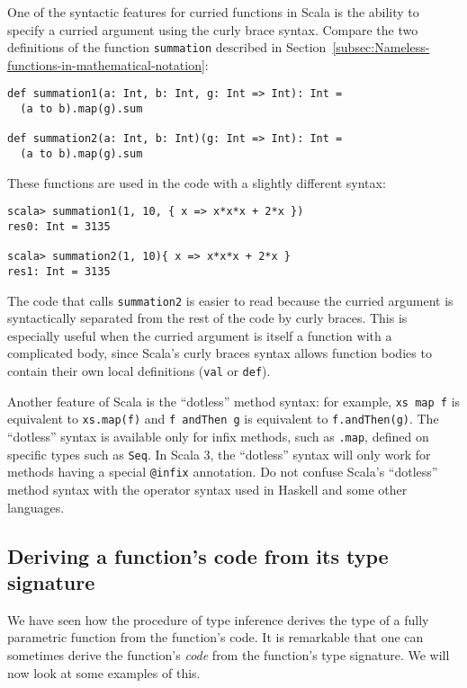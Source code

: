 One of the syntactic features for curried functions in Scala is the
ability to specify a curried argument using the curly brace syntax.
Compare the two definitions of the function \lstinline!summation!
described in Section~\ref{subsec:Nameless-functions-in-mathematical-notation}:
\begin{lstlisting}
def summation1(a: Int, b: Int, g: Int => Int): Int =
  (a to b).map(g).sum

def summation2(a: Int, b: Int)(g: Int => Int): Int =
  (a to b).map(g).sum
\end{lstlisting}
These functions are used in the code with a slightly different syntax:
\begin{lstlisting}
scala> summation1(1, 10, { x => x*x*x + 2*x })
res0: Int = 3135

scala> summation2(1, 10){ x => x*x*x + 2*x }
res1: Int = 3135
\end{lstlisting}

The code that calls \lstinline!summation2! is easier to read because
the curried argument is syntactically separated from the rest of the
code by curly braces. This is especially useful when the curried argument
is itself a function with a complicated body, since Scala's curly
braces syntax allows function bodies to contain their own local definitions
(\lstinline!val! or \lstinline!def!).

Another feature of Scala is the ``dotless'' method syntax: for example,
\lstinline!xs map f! is equivalent to \lstinline!xs.map(f)! and
\lstinline!f andThen g! is equivalent to \lstinline!f.andThen(g)!.
The ``dotless'' syntax is available only for infix methods, such
as \lstinline!.map!, defined on specific types such as \lstinline!Seq!.
In Scala 3, the ``dotless'' syntax will only work for methods having
a special \lstinline!@infix! annotation. Do not confuse Scala's ``dotless''
method syntax with the operator syntax used in Haskell and some other
languages.

\subsection{Deriving a function's code from its type signature}

We have seen how the procedure of type inference
derives the type of a fully parametric function from the function's
code. It is remarkable that one can sometimes derive the function's
\emph{code} from the function's type signature. We will now look at
some examples of this.

